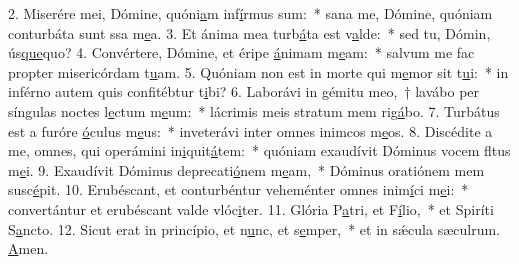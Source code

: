 2. Miserére mei, Dómine, quóni\uline{a}m inf\uline{í}rmus sum:~* sana me, Dómine, quóniam conturbáta sunt ssa m\uline{e}a.
3. Et ánima mea turb\uline{á}ta est v\uline{a}lde:~* sed tu, Dómin, ús\uline{que}quo?
4. Convértere, Dómine, et éripe \uline{á}nimam m\uline{e}am:~* salvum me fac propter misericórdam t\uline{u}am.
5. Quóniam non est in morte qui m\uline{e}mor sit t\uline{u}i:~* in inférno autem quis confitébtur t\uline{i}bi?
6. Laborávi in gémitu meo,~† lavábo per síngulas noctes l\uline{e}ctum m\uline{e}um:~* lácrimis meis stratum mem rig\uline{á}bo.
7. Turbátus est a furóre \uline{ó}culus m\uline{e}us:~* inveterávi inter omnes inimcos m\uline{e}os.
8. Discédite a me, omnes, qui operámini in\uline{i}quit\uline{á}tem:~* quóniam exaudívit Dóminus vocem fltus m\uline{e}i.
9. Exaudívit Dóminus deprecati\uline{ó}nem m\uline{e}am,~* Dóminus oratiónem mem susc\uline{é}pit.
10. Erubéscant, et conturbéntur veheménter omnes inim\uline{í}ci m\uline{e}i:~* convertántur et erubéscant valde vlóc\uline{i}ter.
11. Glória P\uline{a}tri, et F\uline{í}lio,~* et Spiríti S\uline{a}ncto.
12. Sicut erat in princípio, et n\uline{u}nc, et s\uline{e}mper,~* et in sǽcula sæculrum. \uline{A}men.
